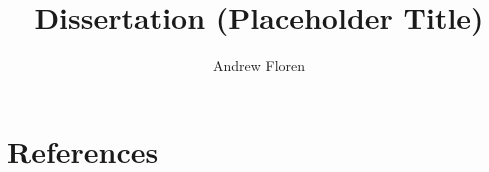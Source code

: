 \documentclass{article}
\title{Dissertation (Placeholder Title)}
\author{Andrew Floren}
\begin{document}
\maketitle











\section{References}

\end{document}
